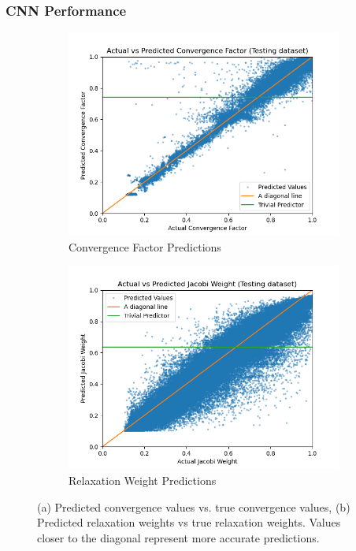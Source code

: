 \documentclass[handout]{beamer}
\begin{document}
\begin{frame}
  \frametitle{CNN Performance}
  \begin{figure}[h]
  \centering
  \begin{subfigure}{.48\textwidth}
    \includegraphics[width=\textwidth]{figures/poisson_conv_test_pred.png}
    \caption{Convergence Factor Predictions}
  \end{subfigure}
  \begin{subfigure}{.48\textwidth}
    \includegraphics[width=\textwidth]{figures/poisson_jacobi_test_pred.png}
    \caption{Relaxation Weight Predictions}
  \end{subfigure}
  \caption{(a) Predicted convergence values vs. true convergence values, (b) Predicted relaxation weights vs true relaxation weights.  Values closer to the diagonal represent more accurate predictions. }
  \label{fig:poisson_conv_pred}
\end{figure}
\end{frame}
\end{document}
